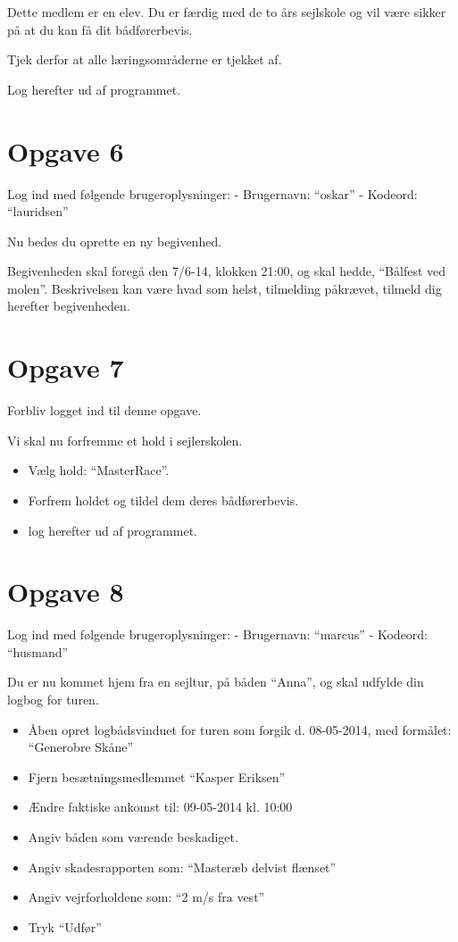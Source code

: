 Dette medlem er en elev. Du er færdig med de to års sejlskole og vil være sikker på at du kan få dit bådførerbevis.

Tjek derfor at alle læringsområderne er tjekket af.

Log herefter ud af programmet.


\section{Opgave 6} 

Log ind med følgende brugeroplysninger: 
\newline - Brugernavn: ``oskar''
\newline - Kodeord: ``lauridsen''

Nu bedes du oprette en ny begivenhed.

Begivenheden skal foregå den 7/6-14, klokken 21:00, og skal hedde, ``Bålfest ved molen''. Beskrivelsen kan være hvad som helst, tilmelding påkrævet, tilmeld dig herefter begivenheden.


\section{Opgave 7}

Forbliv logget ind til denne opgave.

Vi skal nu forfremme et hold i sejlerskolen.

\begin{itemize}
\item Vælg hold: ``MasterRace''.
\item Forfrem holdet og tildel dem deres bådførerbevis.
\item log herefter ud af programmet.
\end{itemize}

\section{Opgave 8}

Log ind med følgende brugeroplysninger: 
\newline - Brugernavn: ``marcus''
\newline - Kodeord: ``husmand''

Du er nu kommet hjem fra en sejltur, på båden ``Anna'', og skal udfylde din logbog for turen.

\begin{itemize}
	\item Åben opret logbådsvinduet for turen som forgik d. 08-05-2014, med formålet: ``Generobre Skåne''
	\item Fjern besætningsmedlemmet ``Kasper Eriksen''
	\item Ændre faktiske ankomst til: 09-05-2014 kl. 10:00
	\item Angiv båden som værende beskadiget.
	\item Angiv skadesrapporten som: ``Masteræb delvist flænset''
	\item Angiv vejrforholdene som: ``2 m/s fra vest''
	\item Tryk ``Udfør''
\end{itemize}

